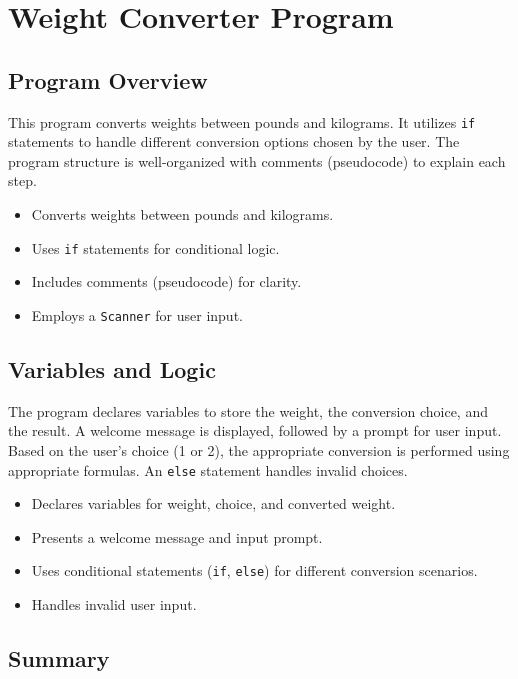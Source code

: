 \documentclass{article}
\begin{document}
\section{Weight Converter Program}

\subsection{Program Overview}

This program converts weights between pounds and kilograms. It utilizes \texttt{if} statements to handle different conversion options chosen by the user. The program structure is well-organized with comments (pseudocode) to explain each step.

\begin{itemize}
    \item Converts weights between pounds and kilograms.
    \item Uses \texttt{if} statements for conditional logic.
    \item Includes comments (pseudocode) for clarity.
    \item Employs a \texttt{Scanner} for user input.
\end{itemize}

\subsection{Variables and Logic}

The program declares variables to store the weight, the conversion choice, and the result.  A welcome message is displayed, followed by a prompt for user input. Based on the user's choice (1 or 2), the appropriate conversion is performed using appropriate formulas.  An \texttt{else} statement handles invalid choices.

\begin{itemize}
    \item Declares variables for weight, choice, and converted weight.
    \item Presents a welcome message and input prompt.
    \item Uses conditional statements (\texttt{if}, \texttt{else}) for different conversion scenarios.
    \item Handles invalid user input.
\end{itemize}

\subsection{Summary}
\end{document}

